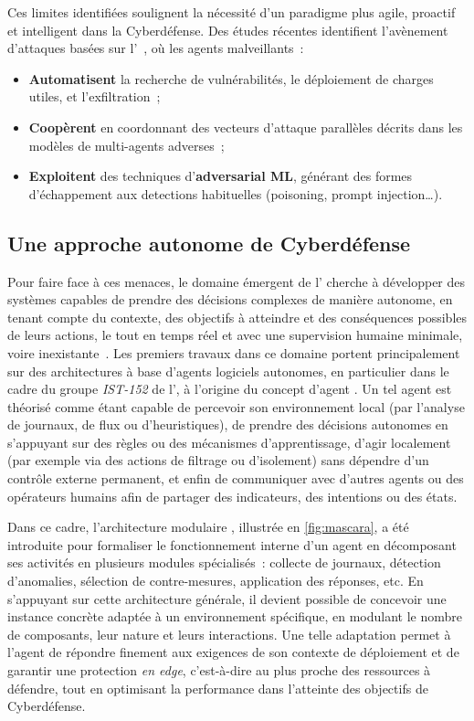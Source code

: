 Ces limites identifiées soulignent la nécessité d'un paradigme plus agile, proactif et intelligent dans la Cyberdéfense. Des études récentes identifient l'avènement d'attaques basées sur l'~\cite{Miles2018,AutoAttacker2024,Falong2025}, où les agents malveillants~:
\begin{itemize}
  \item \textbf{Automatisent} la recherche de vulnérabilités, le déploiement de charges utiles, et l'exfiltration~;
  \item \textbf{Coopèrent} en coordonnant des vecteurs d'attaque parallèles décrits dans les modèles de multi-agents adverses~;
  \item \textbf{Exploitent} des techniques d'\textbf{adversarial ML}, générant des formes d'échappement aux detections habituelles (poisoning, prompt injection…).
\end{itemize}

\subsection*{Une approche autonome de Cyberdéfense}

Pour faire face à ces menaces, le domaine émergent de l' cherche à développer des systèmes capables de prendre des décisions complexes de manière autonome, en tenant compte du contexte, des objectifs à atteindre et des conséquences possibles de leurs actions, le tout en temps réel et avec une supervision humaine minimale, voire inexistante~\cite{Vyas2023}. Les premiers travaux dans ce domaine portent principalement sur des architectures à base d'agents logiciels autonomes, en particulier dans le cadre du groupe \textit{IST-152} de l', à l'origine du concept d'agent .
Un tel agent est théorisé comme étant capable de percevoir son environnement local (par l'analyse de journaux, de flux ou d'heuristiques), de prendre des décisions autonomes en s'appuyant sur des règles ou des mécanismes d'apprentissage, d'agir localement (par exemple via des actions de filtrage ou d'isolement) sans dépendre d'un contrôle externe permanent, et enfin de communiquer avec d'autres agents ou des opérateurs humains afin de partager des indicateurs, des intentions ou des états.

Dans ce cadre, l'architecture modulaire , illustrée en \autoref{fig:mascara}, a été introduite pour formaliser le fonctionnement interne d'un agent  en décomposant ses activités en plusieurs modules spécialisés~: collecte de journaux, détection d'anomalies, sélection de contre-mesures, application des réponses, etc. En s'appuyant sur cette architecture générale, il devient possible de concevoir une instance concrète adaptée à un environnement spécifique, en modulant le nombre de composants, leur nature et leurs interactions. Une telle adaptation permet à l'agent  de répondre finement aux exigences de son contexte de déploiement et de garantir une protection {\em en edge}, c'est-à-dire au plus proche des ressources à défendre, tout en optimisant la performance dans l'atteinte des objectifs de Cyberdéfense.

